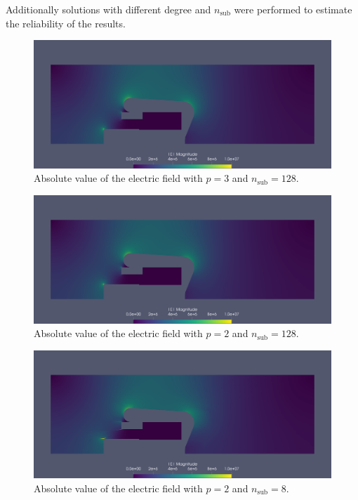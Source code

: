 Additionally solutions with different degree and $n_\mathrm{sub}$ were performed to estimate the reliability of the results.

\begin{center}
\begin{figure}[H]
  \includegraphics[width=\textwidth]{figures/200kV/gradient_degree=3_nsub=128}
  \caption{Absolute value of the electric field with $p=3$ and $n_\mathrm{sub}=128$.}
\end{figure}
\end{center}

\begin{center}
\begin{figure}[H]
  \includegraphics[width=\textwidth]{figures/200kV/gradient_degree=2_nsub=128}
  \caption{Absolute value of the electric field with $p=2$ and $n_\mathrm{sub}=128$.}
\end{figure}
\end{center}

\begin{center}
\begin{figure}[H]
  \includegraphics[width=\textwidth]{figures/200kV/gradient_degree=2_nsub=8}
  \caption{Absolute value of the electric field with $p=2$ and $n_\mathrm{sub}=8$.}
\end{figure}
\end{center}

